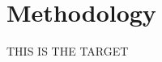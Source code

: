 \documentclass[main.tex]{subfiles}
\begin{document}
\section{Methodology}
\hypertarget{method}{THIS IS THE TARGET}
\end{document}
